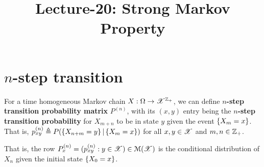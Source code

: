 \documentclass[letterpaper,10pt,english]{article}
\title{ Lecture-20: Strong Markov Property}
\author{}
\begin{document}
\maketitle

\section{$n$-step transition}
\begin{defn}
For a time homogeneous Markov chain $X:\Omega\to\mathscr{X}^{\mathbb{Z}_+}$, we can define \textbf{$n$-step transition probability matrix} $P^{(n)}$, 
with its $(x,y)$ entry being the \textbf{$n$-step transition probability} for $X_{m+n}$ to be in state $y$ given the event $\left\{X_m = x\right\}$. 
That is, 
$
p_{xy}^{(n)} \triangleq P(\left\{X_{n+m} = y \right\}|\left\{ X_m = x\right\}) 
$
for all $x,y \in \mathscr{X}$ and $m,n \in \mathbb{Z}_+$.
\end{defn}
\begin{rem}
That is, the row $P^{(n)}_x = (p^{(n)}_{xy}: y \in \mathscr{X}) \in \mathcal{M}(\mathscr{X})$ is the conditional distribution of $X_n$ given the initial state $\left\{X_0 = x\right\}$. 
\end{rem} 
\end{document}
